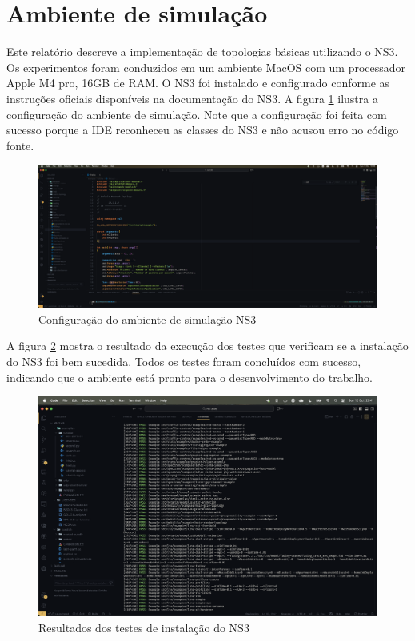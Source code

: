 \documentclass[12pt,a4paper]{article}
\begin{document}
\section{Ambiente de simulação}

Este relatório descreve a implementação de topologias básicas utilizando o NS3. Os experimentos foram conduzidos em um ambiente MacOS com um processador Apple M4 pro, 16GB de RAM. O NS3 foi instalado e configurado conforme as instruções oficiais disponíveis na documentação do NS3. A figura \ref{fig:ns3_setup} ilustra a configuração do ambiente de simulação. Note que a configuração foi feita com sucesso porque a IDE reconheceu as classes do NS3 e não acusou erro no código fonte.

\begin{figure}[H]
    \centering
    \includegraphics[width=1\textwidth]{initial_setup.png}
    \caption{Configuração do ambiente de simulação NS3}
    \label{fig:ns3_setup}
\end{figure}

A figura \ref{fig:ns3_test} mostra o resultado da execução dos testes que verificam se a instalação do NS3 foi bem sucedida. Todos os testes foram concluídos com sucesso, indicando que o ambiente está pronto para o desenvolvimento do trabalho.

\begin{figure}[H]
    \centering
    \includegraphics[width=1\textwidth]{test_results.png}
    \caption{Resultados dos testes de instalação do NS3}
    \label{fig:ns3_test}
\end{figure}
\end{document}
